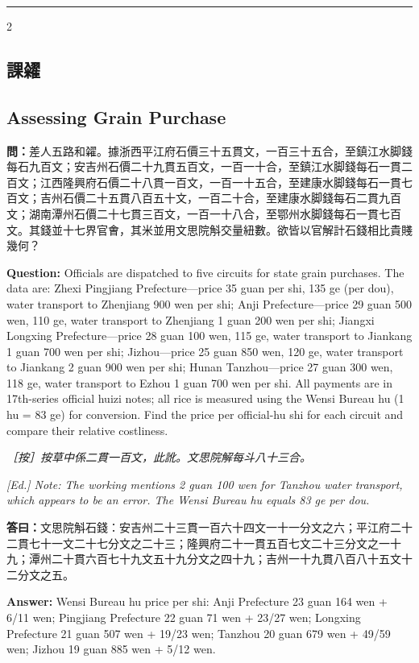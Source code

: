 \documentclass[11pt,a4paper]{article}
\newcommand{\longline}{\noindent\rule{\textwidth}{0.4pt}}
\newcommand{\QuestionText}[1]{\par\noindent\textbf{\color{problemcolor}問：}#1\par}
\newcommand{\AnswerText}[1]{\par\noindent\textbf{\color{answercolor}答曰：}#1\par}
\newcommand{\EdNoteText}[1]{\par\noindent\textit{\color{ednotecolor}［按］#1}\par}
\newcommand{\QuestionEn}[1]{\par\noindent\textbf{\color{problemcolor}Question:} #1\par}
\newcommand{\AnswerEn}[1]{\par\noindent\textbf{\color{answercolor}Answer:} #1\par}
\newcommand{\EdNoteEn}[1]{\par\noindent\textit{\color{ednotecolor}[Ed.] #1}\par}
\begin{document}
\longline

\begin{paracol}{2}

\subsection*{\color{sectioncolor}課糴}
\switchcolumn
\subsection*{\color{sectioncolor}Assessing Grain Purchase}
\switchcolumn*

\QuestionText{差人五路和糴。據浙西平江府石價三十五貫文，一百三十五合，至鎮江水脚錢每石九百文；安吉州石價二十九貫五百文，一百一十合，至鎮江水脚錢每石一貫二百文；江西隆興府石價二十八貫一百文，一百一十五合，至建康水脚錢每石一貫七百文；吉州石價二十五貫八百五十文，一百二十合，至建康水脚錢每石二貫九百文；湖南潭州石價二十七貫三百文，一百一十八合，至鄂州水脚錢每石一貫七百文。其錢並十七界官㑹，其米並用文思院斛交量紐數。欲皆以官解計石錢相比貴賤幾何？}
\switchcolumn
\QuestionEn{Officials are dispatched to five circuits for state grain purchases. The data are: Zhexi Pingjiang Prefecture---price 35 guan per shi, 135 ge (per dou), water transport to Zhenjiang 900 wen per shi; Anji Prefecture---price 29 guan 500 wen, 110 ge, water transport to Zhenjiang 1 guan 200 wen per shi; Jiangxi Longxing Prefecture---price 28 guan 100 wen, 115 ge, water transport to Jiankang 1 guan 700 wen per shi; Jizhou---price 25 guan 850 wen, 120 ge, water transport to Jiankang 2 guan 900 wen per shi; Hunan Tanzhou---price 27 guan 300 wen, 118 ge, water transport to Ezhou 1 guan 700 wen per shi. All payments are in 17th-series official huizi notes; all rice is measured using the Wensi Bureau hu (1 hu = 83 ge) for conversion. Find the price per official-hu shi for each circuit and compare their relative costliness.}
\switchcolumn*

\EdNoteText{按草中係二貫一百文，此訛。文思院解每斗八十三合。}
\switchcolumn
\EdNoteEn{Note: The working mentions 2 guan 100 wen for Tanzhou water transport, which appears to be an error. The Wensi Bureau hu equals 83 ge per dou.}
\switchcolumn*

\AnswerText{文思院斛石錢：安吉州二十三貫一百六十四文一十一分文之六；平江府二十二貫七十一文二十七分文之二十三；隆興府二十一貫五百七文二十三分文之一十九；潭州二十貫六百七十九文五十九分文之四十九；吉州一十九貫八百八十五文十二分文之五。}
\switchcolumn
\AnswerEn{Wensi Bureau hu price per shi: Anji Prefecture 23 guan 164 wen + 6/11 wen; Pingjiang Prefecture 22 guan 71 wen + 23/27 wen; Longxing Prefecture 21 guan 507 wen + 19/23 wen; Tanzhou 20 guan 679 wen + 49/59 wen; Jizhou 19 guan 885 wen + 5/12 wen.}
\switchcolumn*


\end{paracol}
\end{document}
